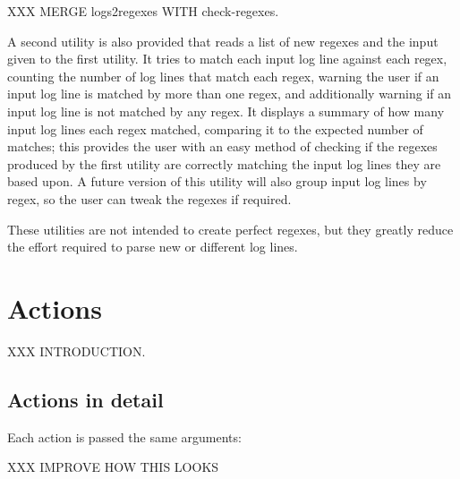XXX MERGE logs2regexes WITH check-regexes.

A second utility is also provided that reads a list of new regexes and
the input given to the first utility.  It tries to match each input log
line against each regex, counting the number of log lines that match
each regex, warning the user if an input log line is matched by more
than one regex, and additionally warning if an input log line is not
matched by any regex.  It displays a summary of how many input log lines
each regex matched, comparing it to the expected number of matches; this
provides the user with an easy method of checking if the regexes
produced by the first utility are correctly matching the input log lines
they are based upon.  A future version of this utility will also group
input log lines by regex, so the user can tweak the regexes if
required.

These utilities are not intended to create perfect regexes, but they
greatly reduce the effort required to parse new or different log lines.

\section{Actions}

\label{actions in implementation}

XXX INTRODUCTION\@.

\subsection{Actions in detail}

\label{actions-in-detail}

Each action is passed the same arguments:


XXX IMPROVE HOW THIS LOOKS


